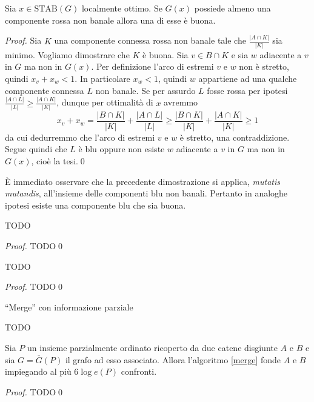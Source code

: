 {\begin{definition}
\end{definition}
\begin{lemma}
	\label{goodlemma} Sia \(x\in \text{STAB}(G)\) localmente ottimo. Se \(G(x)\) possiede almeno una componente rossa non banale allora una di esse è buona. 
\end{lemma}
\begin{proof}
	Sia \(K\) una componente connessa rossa non banale tale che \(\frac{|A\cap K|}{|K|}\) sia minimo. Vogliamo dimostrare che \(K\) è buona. Sia \(v\in B\cap K\) e sia \(w\) adiacente a \(v\) in \(G\) ma non in \(G(x)\). Per definizione l'arco di estremi \(v\) e \(w\) non è stretto, quindi \(x_v+x_w<1\). In particolare \(x_w<1\), quindi \(w\) appartiene ad una qualche componente connessa \(L\) non banale. Se per assurdo \(L\) fosse rossa per ipotesi \(\frac{|A\cap L|}{|L|}\ge\frac{|A\cap K|}{|K|}\), dunque per ottimalità di \(x\) avremmo
	\[x_v+x_w=\frac{|B\cap K|}{|K|}+\frac{|A\cap L|}{|L|}\ge\frac{|B\cap K|}{|K|}+\frac{|A\cap K|}{|K|}\ge 1\]
	da cui dedurremmo che l'arco di estremi \(v\) e \(w\) è stretto, una contraddizione. Segue quindi che \(L\) è blu oppure non esiste \(w\) adiacente a \(v\) in \(G\) ma non in \(G(x)\), cioè la tesi.\qed 
\end{proof}
È immediato osservare che la precedente dimostrazione si applica, \emph{mutatis mutandis}, all'insieme delle componenti blu non banali. Pertanto in analoghe ipotesi esiste una componente blu che sia buona. 
\begin{lemma}
	\label{evolutionlemma} TODO 
\end{lemma}
\begin{proof}
	TODO\qed 
\end{proof}
\begin{lemma}
	\label{finallemma} TODO 
\end{lemma}
\begin{proof}
	TODO\qed 
\end{proof}
\begin{algorithm}
	\caption{``Merge'' con informazione parziale} \label{merge} 
	\begin{algorithmic}
		[1] \STATE TODO 
	\end{algorithmic}
\end{algorithm}
\begin{theorem}
	\label{mergetheorem} Sia \(P\) un insieme parzialmente ordinato ricoperto da due catene disgiunte \(A\) e \(B\) e sia \(G=\overline{G}(P)\) il grafo ad esso associato. Allora l'algoritmo \ref{merge} fonde \(A\) e \(B\) impiegando al più \(6\log{e(P)}\) confronti. 
\end{theorem}
\begin{proof}
	TODO\qed 
\end{proof}

}
